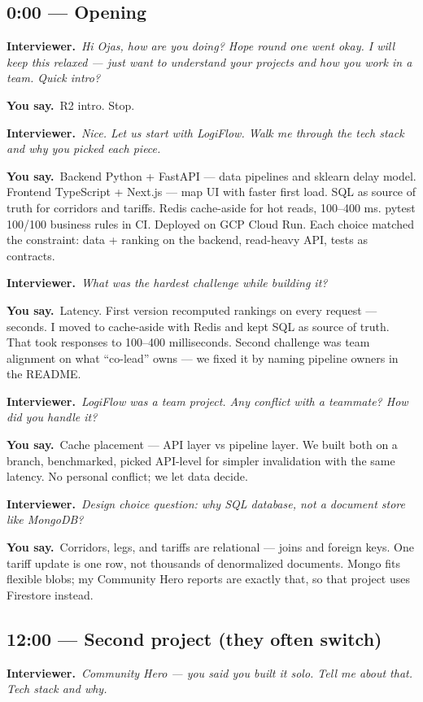 \documentclass[11pt,a4paper]{article}
\newcommand{\IV}[1]{\par\vspace{4pt}\noindent\textcolor{qcol}{\textbf{Interviewer.}}~\textit{#1}\par}
\newcommand{\You}[1]{%
  \par\vspace{2pt}%
  \noindent\colorbox{youbg}{%
    \parbox{\dimexpr\textwidth-2\fboxsep}{\vspace{3pt}\textcolor{you}{\textbf{\small You say.}}~#1\vspace{3pt}}%
  }\par}
\begin{document}
\subsection*{0:00 --- Opening}

\IV{Hi Ojas, how are you doing? Hope round one went okay. I will keep this relaxed --- just want to understand your projects and how you work in a team. Quick intro?}

\You{R2 intro. Stop.}

\IV{Nice. Let us start with LogiFlow. Walk me through the tech stack and \emph{why} you picked each piece.}

\You{Backend Python + FastAPI --- data pipelines and sklearn delay model. Frontend TypeScript + Next.js --- map UI with faster first load. SQL as source of truth for corridors and tariffs. Redis cache-aside for hot reads, 100--400 ms. pytest 100/100 business rules in CI. Deployed on GCP Cloud Run. Each choice matched the constraint: data + ranking on the backend, read-heavy API, tests as contracts.}

\IV{What was the hardest challenge while building it?}

\You{Latency. First version recomputed rankings on every request --- seconds. I moved to cache-aside with Redis and kept SQL as source of truth. That took responses to 100--400 milliseconds. Second challenge was team alignment on what ``co-lead'' owns --- we fixed it by naming pipeline owners in the README.}

\IV{LogiFlow was a team project. Any conflict with a teammate? How did you handle it?}

\You{Cache placement --- API layer vs pipeline layer. We built both on a branch, benchmarked, picked API-level for simpler invalidation with the same latency. No personal conflict; we let data decide.}

\IV{Design choice question: why SQL database, not a document store like MongoDB?}

\You{Corridors, legs, and tariffs are relational --- joins and foreign keys. One tariff update is one row, not thousands of denormalized documents. Mongo fits flexible blobs; my Community Hero reports are exactly that, so that project uses Firestore instead.}

\subsection*{12:00 --- Second project (they often switch)}

\IV{Community Hero --- you said you built it solo. Tell me about that. Tech stack and why.}
\end{document}
